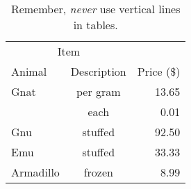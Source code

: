 \begin{table}[htbp]
   \centering
   \caption{Remember, \emph{never} use vertical lines in tables.}\label{tab:booktabs}
   \begin{tabular}{@{} lcr @{}} %
      \toprule
      \multicolumn{2}{c}{Item} \\
      \cmidrule(r){1-2} %
      Animal    & Description & Price (\$)\\
      \midrule
      Gnat      & per gram & 13.65 \\
                & each     &  0.01 \\
      Gnu       & stuffed  & 92.50 \\
      Emu       & stuffed  & 33.33 \\
      Armadillo & frozen   &  8.99 \\
      \bottomrule
   \end{tabular}
\end{table}
